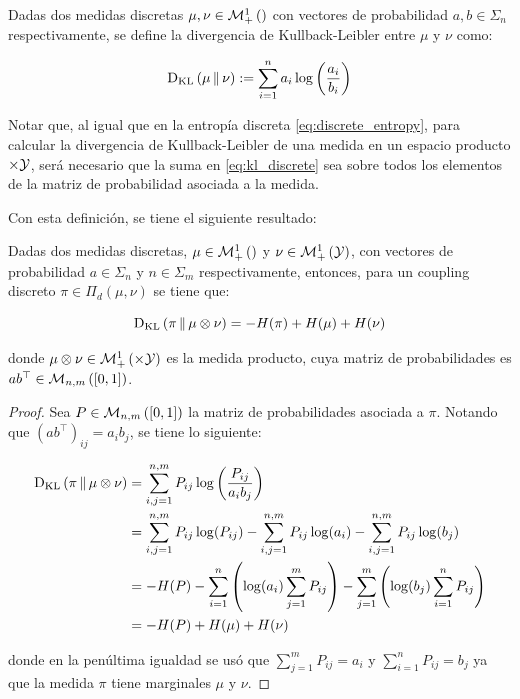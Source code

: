 \begin{defn}
	Dadas dos medidas discretas $\mu,\nu \in\mathcal{M}_+^1\left(\right)$ con vectores de probabilidad $a,b\in\Sigma_n$ respectivamente, se define la divergencia de Kullback-Leibler entre $\mu$ y $\nu$ como:

	\begin{equation}
		\label{eq:kl_discrete}
		\operatorname{D_{KL}}\left(\mu\,\|\,\nu\right) := \sum_{i=1}^{n} a_i\log\left(\frac{a_i}{b_i}\right)
	\end{equation}
\end{defn}

Notar que, al igual que en la entropía discreta \eqref{eq:discrete_entropy}, para calcular la divergencia de Kullback-Leibler de una medida en un espacio producto $\times\mathcal{Y}$, será necesario que la suma en \eqref{eq:kl_discrete} sea sobre todos los elementos de la matriz de probabilidad asociada a la medida.

Con esta definición, se tiene el siguiente resultado:

\begin{prop}
	Dadas dos medidas discretas, $\mu\in\mathcal{M}_+^1\left(\right)$ y $\nu\in\mathcal{M}_+^1\left(\mathcal{Y}\right)$, con vectores de probabilidad $a\in\Sigma_n$ y $n\in\Sigma_m$ respectivamente, entonces, para un coupling discreto $\pi\in\Pi_d(\mu,\nu)$ se tiene que:

	\begin{equation}
		\operatorname{D_{KL}}\left(\pi\,\|\,\mu\otimes\nu\right) = -H(\pi) + H(\mu) + H(\nu)
	\end{equation}

	donde $\mu\otimes\nu\in\probmeasure{\xspace\times\yspace}$ es la medida producto, cuya matriz de probabilidades es $ab^\top\in\mathcal{M}_{n,m}\left([0,1]\right)$.
\end{prop}

\begin{proof}
	Sea $P\in\mathcal{M}_{n,m}\left([0,1]\right)$ la matriz de probabilidades asociada a $\pi$. Notando que $(ab^\top)_{ij} = a_i b_j$, se tiene lo siguiente:

	\begin{align}
		\operatorname{D_{KL}}\left(\pi\,\|\,\mu\otimes\nu\right) & = \sum_{i,j=1}^{n,m} P_{ij}\log\left(\frac{P_{ij}}{a_ib_j}\right)                                                      \\
		                        & = \sum_{i,j=1}^{n,m} P_{ij}\log(P_{ij}) - \sum_{i,j=1}^{n,m} P_{ij}\log(a_i) - \sum_{i,j=1}^{n,m} P_{ij} \log(b_j) \\
		                        & = -H(P) - \sum_{i=1}^n \left(\log(a_i)\sum_{j=1}^m P_{ij}\right) - \sum_{j=1}^m \left(\log(b_j) \sum_{i=1}^n P_{ij}\right) \\
		                        & = -H(P) + H(\mu) + H(\nu)
	\end{align}

	donde en la penúltima igualdad se usó que $\sum_{j=1}^m P_{ij} = a_i$ y $\sum_{i=1}^n P_{ij} = b_j$ ya que la medida $\pi$ tiene marginales $\mu$ y $\nu$.
\end{proof}

